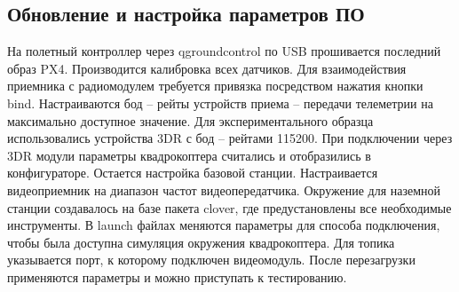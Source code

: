 \subsection{Обновление и настройка параметров ПО}
На полетный контроллер через qgroundcontrol по USB прошивается последний образ PX4. Производится калибровка всех датчиков. Для взаимодействия приемника с радиомодулем требуется привязка посредством нажатия кнопки bind.
Настраиваются бод -- рейты устройств приема -- передачи телеметрии на максимально доступное значение. Для экспериментального образца использовались устройства 3DR с бод -- рейтами 115200. При подключении через 3DR модули параметры квадрокоптера считались и отобразились в конфигураторе. Остается настройка базовой станции. Настраивается видеоприемник на диапазон частот видеопередатчика. Окружение для наземной станции создавалось на базе пакета clover, где предустановлены все необходимые инструменты. В launch файлах меняются параметры для способа подключения, чтобы была доступна симуляция окружения квадрокоптера. Для топика указывается порт, к которому подключен видеомодуль. После перезагрузки применяются параметры и можно приступать к тестированию.
